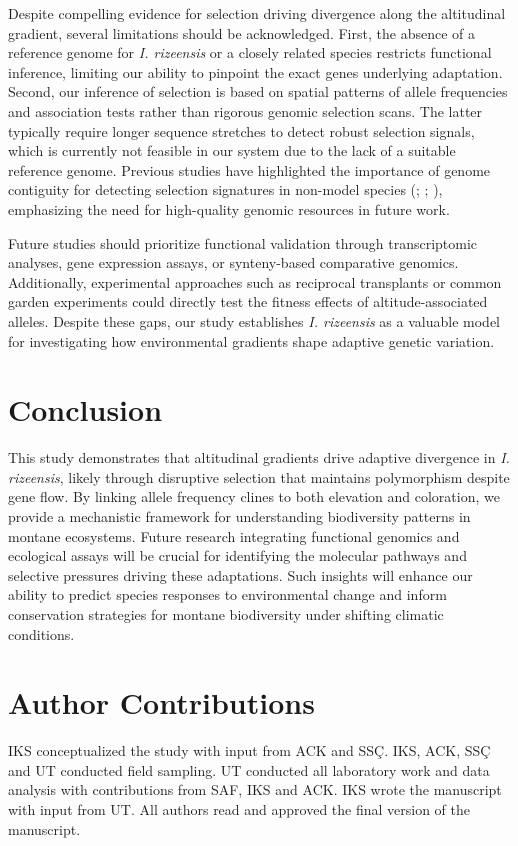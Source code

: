 \documentclass[9pt,a4paper,twoside]{rho-class/rho}
\begin{document}
    Despite compelling evidence for selection driving divergence along the altitudinal gradient, several limitations should be acknowledged. First, the absence of a reference genome for \textit{I. rizeensis} or a closely related species restricts functional inference, limiting our ability to pinpoint the exact genes underlying adaptation. Second, our inference of selection is based on spatial patterns of allele frequencies and association tests rather than rigorous genomic selection scans. The latter typically require longer sequence stretches to detect robust selection signals, which is currently not feasible in our system due to the lack of a suitable reference genome. Previous studies have highlighted the importance of genome contiguity for detecting selection signatures in non-model species (\cite{hoban2016finding}; \cite{fumagalli2013assessing}; \cite{lotterhos2019effect}), emphasizing the need for high-quality genomic resources in future work.

    Future studies should prioritize functional validation through transcriptomic analyses, gene expression assays, or synteny-based comparative genomics. Additionally, experimental approaches such as reciprocal transplants or common garden experiments could directly test the fitness effects of altitude-associated alleles. Despite these gaps, our study establishes \textit{I. rizeensis} as a valuable model for investigating how environmental gradients shape adaptive genetic variation.

\section{Conclusion}

This study demonstrates that altitudinal gradients drive adaptive divergence in \textit{I. rizeensis}, likely through disruptive selection that maintains polymorphism despite gene flow. By linking allele frequency clines to both elevation and coloration, we provide a mechanistic framework for understanding biodiversity patterns in montane ecosystems. Future research integrating functional genomics and ecological assays will be crucial for identifying the molecular pathways and selective pressures driving these adaptations. Such insights will enhance our ability to predict species responses to environmental change and inform conservation strategies for montane biodiversity under shifting climatic conditions.


\section{Author Contributions}
IKS conceptualized the study with input from ACK and SSÇ. IKS, ACK, SSÇ and UT conducted field sampling. UT conducted all laboratory work and data analysis with contributions from SAF, IKS and ACK. IKS wrote the manuscript with input from UT. All authors read and approved the final version of the manuscript.
\end{document}
